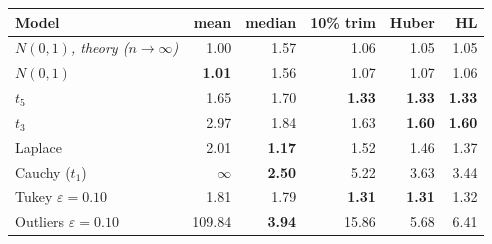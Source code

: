 \begin{tabular}{@{}lrrrrr@{}}
\toprule
Model & mean & median & 10\% trim & Huber & HL\\
\midrule
\emph{$N(0,1)$, theory ($n\to\infty$)} & 1.00 & 1.57 & 1.06 & 1.05 & 1.05\\
\midrule
$N(0,1)$ & \textbf{1.01} & 1.56 & 1.07 & 1.07 & 1.06\\
$t_{5}$ & 1.65 & 1.70 & \textbf{1.33} & \textbf{1.33} & \textbf{1.33}\\
$t_{3}$ & 2.97 & 1.84 & 1.63 & \textbf{1.60} & \textbf{1.60}\\
Laplace & 2.01 & \textbf{1.17} & 1.52 & 1.46 & 1.37\\
Cauchy ($t_1$) & $\infty$ & \textbf{2.50} & 5.22 & 3.63 & 3.44\\
Tukey $\varepsilon{=}0.10$ & 1.81 & 1.79 & \textbf{1.31} & \textbf{1.31} & 1.32\\
Outliers $\varepsilon{=}0.10$ & 109.84 & \textbf{3.94} & 15.86 & 5.68 & 6.41\\
\bottomrule
\end{tabular}
